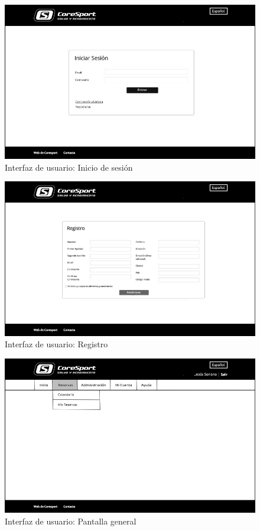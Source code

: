 \begin{figure}[H]
\centering
  \includegraphics[scale=.40]{img/interfaz/inicio-sesion.jpg}
  \caption{Interfaz de usuario: Inicio de sesión}
  \label{fig:interfaz-inicio-sesion}
\end{figure}

\begin{figure}[H]
\centering
  \includegraphics[scale=.40]{img/interfaz/registro.jpg}
  \caption{Interfaz de usuario: Registro}
  \label{fig:interfaz-registro}
\end{figure}

\begin{figure}[H]
\centering
  \includegraphics[scale=.40]{img/interfaz/pantalla-principal.jpg}
  \caption{Interfaz de usuario: Pantalla general}
  \label{fig:interfaz-pantalla-principal}
\end{figure}

